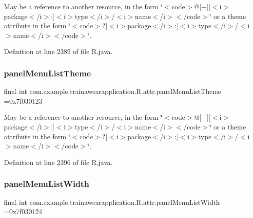 May be a reference to another resource, in the form \char`\"{}$<$code$>$@\mbox{[}+\mbox{]}\mbox{[}$<$i$>$package$<$/i$>$\+:\mbox{]}$<$i$>$type$<$/i$>$/$<$i$>$name$<$/i$>$$<$/code$>$\char`\"{} or a theme attribute in the form \char`\"{}$<$code$>$?\mbox{[}$<$i$>$package$<$/i$>$\+:\mbox{]}$<$i$>$type$<$/i$>$/$<$i$>$name$<$/i$>$$<$/code$>$\char`\"{}. 

Definition at line 2389 of file R.\+java.

\mbox{\label{classcom_1_1example_1_1trainawearapplication_1_1_r_1_1attr_a0f862ab76b3c7ab674b5c0e6169268fb}} 
\subsubsection{\texorpdfstring{panelMenuListTheme}{panelMenuListTheme}}
{\footnotesize\ttfamily final int com.\+example.\+trainawearapplication.\+R.\+attr.\+panel\+Menu\+List\+Theme =0x7f030123\hspace{0.3cm}{\ttfamily [static]}}

May be a reference to another resource, in the form \char`\"{}$<$code$>$@\mbox{[}+\mbox{]}\mbox{[}$<$i$>$package$<$/i$>$\+:\mbox{]}$<$i$>$type$<$/i$>$/$<$i$>$name$<$/i$>$$<$/code$>$\char`\"{} or a theme attribute in the form \char`\"{}$<$code$>$?\mbox{[}$<$i$>$package$<$/i$>$\+:\mbox{]}$<$i$>$type$<$/i$>$/$<$i$>$name$<$/i$>$$<$/code$>$\char`\"{}. 

Definition at line 2396 of file R.\+java.

\mbox{\label{classcom_1_1example_1_1trainawearapplication_1_1_r_1_1attr_a50e1e96a08953c09ec81510e75a05723}} 
\subsubsection{\texorpdfstring{panelMenuListWidth}{panelMenuListWidth}}
{\footnotesize\ttfamily final int com.\+example.\+trainawearapplication.\+R.\+attr.\+panel\+Menu\+List\+Width =0x7f030124\hspace{0.3cm}{\ttfamily [static]}}

